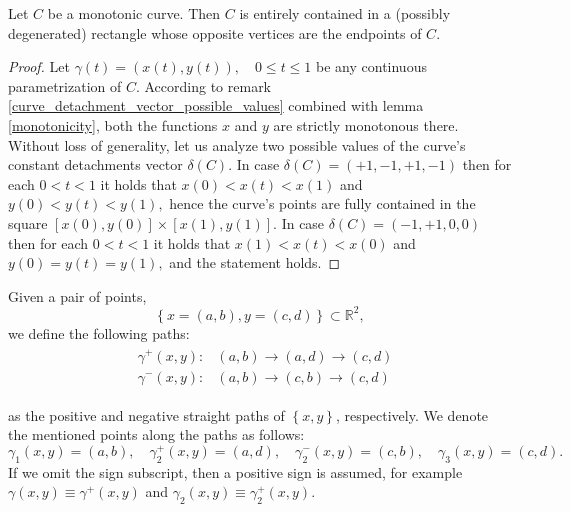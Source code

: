 \documentclass[11pt]{book}
\begin{document}
\begin{corollary}\label{corollary_about_detachment_vector}Let $C$ be a monotonic curve. Then $C$ is entirely contained in a (possibly degenerated) rectangle whose opposite vertices are the endpoints of $C$.
\end{corollary}
\begin{proof}Let $\gamma\left(t\right)=\left(x\left(t\right),y\left(t\right)\right),\quad 0\leq t\leq 1$ be any continuous parametrization of $C.$
According to remark \ref{curve_detachment_vector_possible_values} combined with lemma \ref{monotonicity}, both the functions $x$ and $y$ are strictly monotonous there. Without loss of generality, let us analyze two possible values of the curve’s constant detachments vector $\delta\left(C\right).$
In case $\delta\left( C \right) = \left( +1,-1,+1,-1 \right)$ then for each $0<t<1$ it holds that $x\left(0\right)< x\left(t\right)<x\left(1\right)$ and $y\left(0\right)<y\left(t\right)<y\left(1\right),$
hence the curve’s points are fully contained in the square $\left[x\left(0\right),y\left(0\right)\right]\times\left[x\left(1\right),y\left(1\right)\right].$
In case $\delta\left(C\right) = \left(-1,+1,0,0\right)$ then for each $0< t <1$ it holds that $x\left(1\right)< x\left(t\right)< x\left(0\right)$ and $y\left(0\right) =y\left(t\right) =y\left(1\right),$ and the statement holds.
\end{proof}

\begin{definition}
Given a pair of points,
$$\left\{x=\left(a,b\right), y=\left(c,d\right)\right\}\subset \mathbb{R}^2,$$
we define the following paths:
\begin{align}
\begin{aligned}
 & \gamma^{+}\left(x,y\right): & \left(a,b\right)\longrightarrow\left(a,d\right)\longrightarrow\left(c,d\right)\\
 & \gamma^{-}\left(x,y\right): & \left(a,b\right)\longrightarrow\left(c,b\right)\longrightarrow\left(c,d\right)
\end{aligned}
\end{align}

as the positive and negative straight paths of $\left\{x,y\right\}$, respectively. We denote the mentioned points along the paths as follows:
$$\gamma_1\left(x,y\right) = \left(a,b\right),\quad \gamma^+_2\left(x,y\right) = \left(a,d\right),\quad \gamma^-_2\left(x,y\right) = \left(c,b\right),\quad \gamma_3\left(x,y\right) = \left(c,d\right).$$
If we omit the sign subscript, then a positive sign is assumed, for example $\gamma\left(x,y\right)\equiv\gamma^+\left(x,y\right)$ and $\gamma_2\left(x,y\right)\equiv\gamma^+_2\left(x,y\right).$
\label{straight_path_points_pair}
\end{definition}
\end{document}
